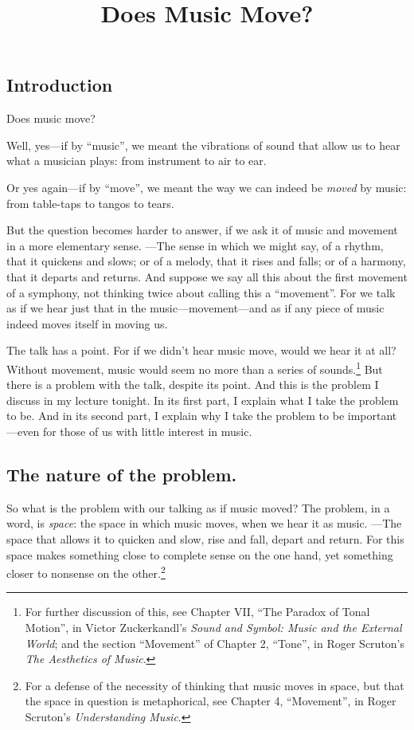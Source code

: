 \documentclass[12pt]{memoir}
\title{Does Music Move?}
\author{}
\date{}
\begin{document}
\maketitle

\subsection{Introduction}

Does music move?

Well, yes---if by ``music'', we meant the vibrations of sound that allow
us to hear what a musician plays: from instrument to air to ear.

Or yes again---if by ``move'', we meant the way we can indeed be
\emph{moved} by music: from table-taps to tangos to tears.

But the question becomes harder to answer, if we ask it of music and
movement in a more elementary sense. ---The sense in which we might say,
of a rhythm, that it quickens and slows; or of a melody, that it rises
and falls; or of a harmony, that it departs and returns. And suppose we
say all this about the first movement of a symphony, not thinking twice
about calling this a ``movement''. For we talk as if we hear just that
in the music---movement---and as if any piece of music indeed moves
itself in moving us.

The talk has a point. For if we didn't hear music move, would we hear it
at all? Without movement, music would seem no more than a series of
sounds.\footnote{For further discussion of this, see Chapter VII, ``The
  Paradox of Tonal Motion'', in Victor Zuckerkandl's \emph{Sound and
  Symbol: Music and the External World}; and the section ``Movement'' of
  Chapter 2, ``Tone'', in Roger Scruton's \emph{The Aesthetics of
  Music}.} But there is a problem with the talk, despite its point. And
this is the problem I discuss in my lecture tonight. In its first
part, I explain what I take the problem to be. And in
its second part, I explain why I take the problem to be important---even for
those of us with little interest in music.

\subsection{The nature of the problem.}

So what is the problem with our talking as if music moved? The problem,
in a word, is \emph{space}: the space in which music moves, when we hear
it as music. ---The space that allows it to quicken and slow, rise and
fall, depart and return. For this space makes something close to
complete sense on the one hand, yet something closer to
nonsense on the other.\footnote{For a defense of the
  necessity of thinking that music moves in space, but that the space in
  question is metaphorical, see Chapter 4, ``Movement'', in Roger
  Scruton's \emph{Understanding Music}.}
\end{document}

